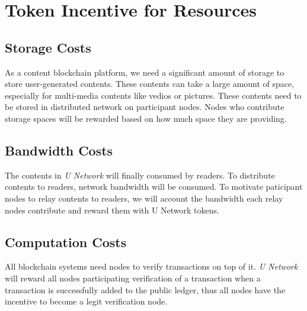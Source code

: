 \section{Token Incentive for Resources}


\subsection{Storage Costs}
As a content blockchain platform, we need a significant amount of storage to store user-generated contents. These contents can take a large amount of space, especially for multi-media contents like vedios or pictures. These contents need to be stored in distributed network on participant nodes. Nodes who contribute storage spaces will be rewarded based on how much space they are providing.

\subsection{Bandwidth Costs}
The contents in \emph{U Network} will finally consumed by readers. To distribute contents to readers, network bandwidth will be consumed. To motivate paticipant nodes to relay contents to readers, we will account the bandwidth each relay nodes contribute and reward them with U Network tokens.

\subsection{Computation Costs}
All blockchain systems need nodes to verify transactions on top of it. \emph{U Network} will reward all nodes participating verification of a transaction when a transaction is successfully added to the public ledger, thus all nodes have the incentive to become a legit verification node. 
